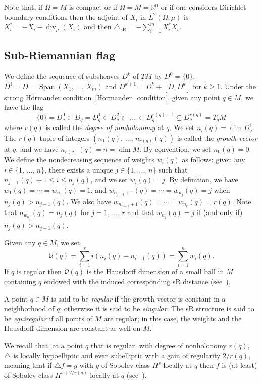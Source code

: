 \documentclass[10pt]{amsart}
\theoremstyle{definition}\newtheorem{defi}[theo]{Definition}\newtheorem{rema}[theo]{Remark}\newtheorem{exam}[theo]{Example}\newtheorem{exem}[theo]{Example}\newtheorem{nota}[theo]{Notation}
\newcommand*\R{\mathbb{R}}
\newcommand{\calQ}{\mathcal{Q}}
\DeclareMathOperator{\Span}{Span}
\DeclareMathOperator{\divl}{div}
\newcommand{\trianglesR}{\triangle_{\mathrm{sR}}}
\renewcommand{\geq}{\geqslant}
\renewcommand{\leq}{\leqslant}
\begin{document}
Note that, if $\Omega=M$ is compact or if $\Omega=M=\R^n$ or if one considers Dirichlet boundary conditions then the adjoint of $X_i$ in $L^2(\Omega,\mu)$ is $X_i^*=-X_i-\divl_\mu(X_i)$ and then $\trianglesR=-\sum_{i=1}^mX_i^*X_i$.



\subsection{Sub-Riemannian flag}\label{sec:sRflag}
We define the sequence of subsheaves $D^k$ of $TM$ by $D^0=\{0\}$, $D^1=D=\Span(X_1,\,\ldots,\,X_m)$ and $D^{k+1}=D^k+[D,D^k]$ for $k\geq 1$. Under the strong H\"ormander condition~\eqref{Hormander_condition}, given any point $q\in M$, we have the flag
\[
\{0\}=D^0_q\subset D_q=D^1_q\subset D^2_q\subset\,\ldots\,\subset D^{r(q)-1}_q\subsetneq D^{r(q)}_q=T_qM
\]
where $r(q)$ is called the \emph{degree of nonholonomy} at $q$. We set $n_i(q) = \dim D^i_q$. The $r(q)$-tuple of integers $(n_1(q),\,\ldots,\,n_{r(q)}(q))$ is called the \emph{growth vector} at $q$, and we have $n_{r(q)}(q)=n=\dim M$. By convention, we set $n_0(q)=0$. We define the nondecreasing sequence of weights $w_i(q)$ as follows: given any $i\in\{1,\,\ldots,\,n\}$, there exists a unique $j\in\{1,\,\ldots,\,n\}$ such that $n_{j-1}(q)+1\leq i\leq n_j(q)$, and we set $w_i(q)=j$. By definition, we have $w_1(q)=\cdots=w_{n_1}(q)=1$, and $w_{n_{j-1}+1}(q)=\cdots=w_{n_j}(q)=j$ when $n_j(q)>n_{j-1}(q)$. We also have $w_{n_{r-1}+1}(q)=\cdots=w_{n_r}(q)=r(q)$. Note that $n_{w_{n_j}}(q) = n_j(q)$ for $j=1,\,\ldots,\,r$ and that $w_{n_j}(q) = j$ if (and only if) $n_j(q)>n_{j-1}(q)$.

Given any $q\in M$, we set
\[
\calQ(q) = \sum_{i=1}^r i \left(n_i(q)-n_{i-1}(q)\right) =\sum_{i=1}^n w_i(q).
\]
If $q$ is regular then $\calQ(q)$ is the Hausdorff dimension of a small ball in $M$ containing $q$ endowed with the induced corresponding sR distance (see~\cite{Gromov}).

A point $q\in M$ is said to be \emph{regular} if the growth vector is constant in a neighborhood of $q$; otherwise it is said to be \emph{singular}. The sR structure is said to be \emph{equiregular} if all points of $M$ are regular; in this case, the weights and the Hausdorff dimension are constant as well on $M$.

We recall that, at a point $q$ that is regular, with degree of nonholonomy $r(q)$, $\triangle$ is locally hypoelliptic and even subelliptic with a gain of regularity $2/r(q)$, meaning that if $\triangle f=g$ with $g$ of Sobolev class $H^s$ locally at $q$ then $f$ is (at least) of Sobolev class $H^{s+2/r(q)}$ locally at $q$ (see~\cite{Ho-67}).
\end{document}
